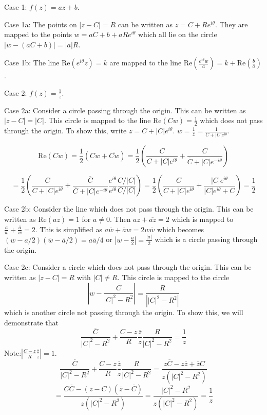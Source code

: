 \documentclass[12pt]{article}
\begin{document}
Case 1: $f(z)=az+b$. 

Case 1a: The points on $|z-C|=R$ can be written as $z=C+R e^{i \theta}$. They are mapped to the points $w = aC + b + a R e^{i \theta}$ which all lie on the circle $|w - (aC+b)| = |a|R$. 

Case 1b: The line $\mbox{Re}(e^{i \theta} z) = k$ are mapped to the line $\mbox{Re}\left(\frac{e^{i \theta}w}{a}\right)=k+\mbox{Re}\left(\frac{b}{a}\right)$.

Case 2: $f(z) = \frac{1}{z}$. 

Case 2a: Consider a circle passing through the origin. This can be written as $|z-C|=|C|$. This circle is mapped to the line ${\mbox{Re}(Cw)}=\frac{1}{2}$ which does not pass through the origin. To show this, write $z=C+|C|e^{i \theta}$. $w=\frac{1}{z}=\frac{1}{C+|C|e^{i \theta}}$. 

$$ \mbox{Re}(Cw)=\frac{1}{2} (Cw+\overline{Cw}) 
= \frac{1}{2} \left( \frac{C}{C+|C|e^{i \theta}} + \frac{\overline{C}}{\overline{C}+|C|e^{-i \theta}} \right) $$

$$= \frac{1}{2} \left( \frac{C}{C+|C|e^{i \theta}} + \frac{\overline{C}}{\overline{C}+|C|e^{-i \theta}} 
\frac{e^{i \theta}}{e^{i \theta}} 
\frac{C/|C|}{C/|C|} \right) 
= \frac{1}{2} \left( \frac{C}{C+|C|e^{i \theta}} + 
\frac{|C| e^{i \theta}}{|C|e^{i \theta}+C} \right) = \frac{1}{2} $$

Case 2b: Consider the line which does not pass through the origin. 
This can be written as $\mbox{Re}(a z )=1$ for $a \ne 0$. Then
$az+\overline{az}=2$ which is mapped to $\frac{a}{w} + \frac{\overline{a}}{\overline{w}} = 2$. This is simplified as
$a\overline{w} + \overline{a}w=2 w\overline{w}$ which becomes
$(w - a/2)(\overline{w}- \overline{a}/2) = a\overline{a}/4$ or 
$\left|w-\frac{a}{2}\right|=\frac{|a|}{2}$ which is a circle passing through the origin.

Case 2c: Consider a circle which does not pass through the origin. This can be written as $|z-C|=R$ with $|C| \ne R$. This circle is mapped to the circle 
$$ \left| w - \frac{\overline{C}}{|C|^2-R^2} \right|= \frac{R}{\left|{|C|^2 - R^2}\right|} $$
which is another circle not passing through the origin. To show this, we will demonstrate that 
$$ \frac{\overline{C}}{|C|^2-R^2} + \frac{C-z}{R} \frac{\overline{z}}{z} \frac{R}{|C|^2 - R^2} = \frac{1}{z}
$$
Note:$\left|\frac{C-z}{R} \frac{\overline{z}}{z}\right|=1$. 
$$ \frac{\overline{C}}{|C|^2-R^2} + \frac{C-z}{R} \frac{\overline{z}}{z} \frac{R}{|C|^2 - R^2} = \frac{z\overline{C} - z\overline{z} + \overline{z}C}{z(|C|^2-R^2)}$$
$$ = \frac{C\overline{C} - (z - C)(\overline{z} - \overline{C})}{z(|C|^2-R^2)} = \frac{|C|^2 - R^2}{z(|C|^2-R^2)} = \frac{1}{z}$$
\end{document}
